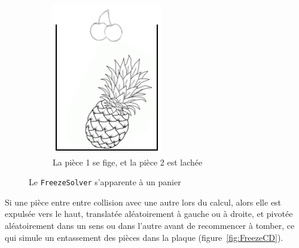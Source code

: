 \begin{figure}[!htb]
\begin{subfigure}{.4\linewidth}
        \includegraphics[width=\linewidth]{img/FreezeB.png}
        \caption{La pièce 1 se fige, et la pièce 2 est lachée}
    \end{subfigure}
    \caption{Le \texttt{FreezeSolver} s'apparente à un panier}
    \label{fig:FreezeAB}
\end{figure}


\indent Si une pièce entre entre collision avec une autre lors du calcul, alors elle est expulsée vers le haut, translatée aléatoirement à gauche ou à droite, et pivotée aléatoirement dans un sens ou dans l'autre avant de recommencer à tomber, ce qui simule un entassement des pièces dans la plaque (figure~\ref{fig:FreezeCD}).\\

